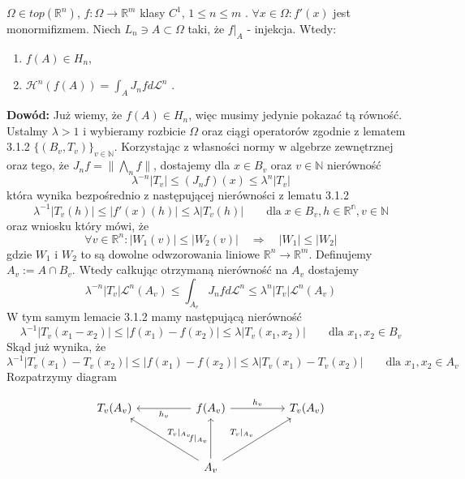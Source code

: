 \begin{tw}
	$\Omega \in top(\mathbb{R}^n)$, $f: \Omega \rightarrow \mathbb{R}^m$ klasy $C^1$, $1 \leq n \leq m$ . $\forall x \in \Omega: f'(x)$ jest monormifizmem. Niech $L_n \ni A \subset \Omega$ taki, że $f|_A$ - injekcja. Wtedy:
	\begin{enumerate}	
		\item $f(A) \in H_n$,
		\item $\mathcal{H}^n(f(A)) = \int_A J_nfd \mathcal{L}^n$ .
	\end{enumerate}
	
	\textbf{Dowód:}\newline
	Już wiemy, że $f(A) \in H_n$, więc musimy jedynie pokazać tą równość. Ustalmy $\lambda > 1$ i wybieramy rozbicie $\Omega$ oraz ciągi operatorów zgodnie z lematem 3.1.2 $\{(B_v, T_v)\}_{v \in \mathbb{N}}$. Korzystając z własności normy w algebrze zewnętrznej oraz tego, że $J_nf = \|\bigwedge_nf\|$, dostajemy dla $x \in B_v$ oraz $v \in \mathbb{N}$ nierówność 
	$$
		\lambda^{-n}|T_v| \leq (J_nf)(x) \leq \lambda^n|T_v|
	$$
	która wynika bezpośrednio z następującej nierówności z lematu 3.1.2
	$$
		\lambda^{-1}|T_v(h)| \leq |f'(x)(h)| \leq \lambda|T_v(h)| \quad\quad  \text{dla} \; x \in B_v, h \in \mathbb{R^n}, v \in \mathbb{N}
	$$ 
	oraz wniosku \citep[AM3, 8.41]{Tworzewski} który mówi, że
	$$
		\forall v \in \mathbb{R}^n: |W_1(v)| \leq |W_2(v)| \quad \Longrightarrow \quad |W_1| \leq |W_2|
	$$
	gdzie $W_1$ i $W_2$ to są dowolne odwzorowania liniowe $\mathbb{R}^n \rightarrow \mathbb{R}^m$.
	Definujemy $A_v := A \cap B_v$. Wtedy całkując otrzymaną nierówność na $A_v$ dostajemy $$
		\lambda^{-n}|T_v|\mathcal{L}^n(A_v) \leq \int_{A_v}J_nf d \mathcal{L}^n \leq \lambda^n |T_v| \mathcal{L}^n(A_v)
	$$
	W tym samym lemacie 3.1.2 mamy następującą nierówność $$
		\lambda^{-1}|T_v(x_1 - x_2)| \leq |f(x_1) - f(x_2)| \leq \lambda |T_v(x_1, x_2)| \quad \quad \text{dla } x_1,x_2 \in B_v  
	$$
	Skąd już wynika, że $$
		\lambda^{-1}|T_v(x_1) - T_v(x_2)| \leq |f(x_1) - f(x_2)| \leq \lambda|T_v(x_1) - T_v(x_2)| \quad \quad \text{dla } x_1, x_2 \in A_v
	$$
	Rozpatrzymy diagram

	$$
	\begin{tikzcd}
		T_v(A_v) &    & f(A_v) \arrow[ll, "h_v"] \arrow[rr, "h_v"]                                               &  & T_v(A_v) \\
				&     &                                                                                   &  &          \\
				&     & A_v \arrow[lluu, "T_v|_{A_v}"'] \arrow[rruu, "T_v|_{A_v}"] \arrow[uu, "f|_{A_v}"] &  &         
	\end{tikzcd}
	$$




\end{tw}

